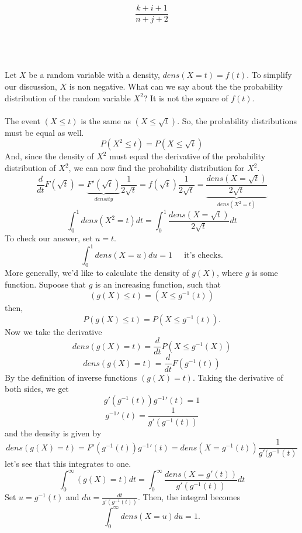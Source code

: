 $$\frac{k+i+1}{n+j+2}$$
\\\\\\\\
Let $X$ be a random variable with a density, $dens(X=t)=f(t)$.  To simplify our discussion, $X$ is non negative.  What can we say about the the probability distribution of the random variable $X^2$?  It is not the square of $f(t)$.  \\\\
\noindent The event $(X\leq t)$ is the same as $(X\leq\sqrt t)$.  So, the probability distributions must be equal as well.  
$$P(X^2\leq t)=P(X\leq \sqrt t)$$  And, since the density of $X^2$ must equal the derivative of the probability distribution of $X^2$, we can now find the probability distribution for $X^2$.
$$\frac{d}{dt}F(\sqrt t)=\underbrace{F'(\sqrt t)}_{density}\frac{1}{2\sqrt t}=f(\sqrt t)\frac{1}{2\sqrt t}=\underbrace{\frac{dens(X=\sqrt t)}{2\sqrt t}}_{dens(X^2=t)}$$
$$\int_0^1 dens(X^2=t)dt=\int_0^1 \frac{dens(X=\sqrt t)}{2 \sqrt t}dt$$
To check our answer, set $u=t$.
$$\int_0^1 dens(X=u)du=1\;\;\;\;\mbox{ it's checks.}$$
More generally, we'd like to calculate the density of $g(X)$, where $g$ is some function.  Supoose that $g$ is an increasing function, such that
$$(g(X)\leq t)=(X\leq g^{-1}(t))$$
then,
$$P(g(X)\leq t)=P(X\leq g^{-1}(t)).$$
Now we take the derivative
$$dens(g(X)=t)=\frac{d}{dt}P(X\leq g^{-1}(X))$$
$$dens(g(X)=t)=\frac{d}{dt}F(g^{-1}(t))$$
By the definition of inverse functions $(g(X)=t)$.  Taking the derivative of both sides, we get 
$$g\prime(g^{-1}(t))g^{-1}\prime(t)=1$$
$$g^{-1}\prime(t)=\frac{1}{g\prime(g^{-1}(t))}$$
and the density is given by
$$dens(g(X)=t)=F\prime(g^{-1}(t))g^{-1}\prime(t)=dens(X=g^{-1}(t))\frac{1}{g\prime(g^{-1}(t)}$$
let's see that this integrates to one.
$$\int_0^{\infty} (g(X)=t)dt=\int_0^{\infty}\frac{dens(X=g\prime(t))}{g\prime(g^{-1}(t))}dt$$
Set $u=g^{-1}(t)$ and $du=\frac{dt}{g\prime(g^{-1}(t))}$.  Then, the integral becomes
$$\int_0^{\infty}dens(X=u)du=1.$$
